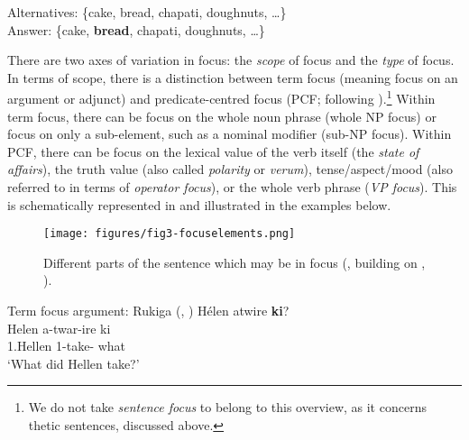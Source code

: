 \documentclass[output=paper]{langscibook}
\begin{document}
\gll
Alternatives:   {\{cake, bread, chapati, doughnuts, …\}}\\
Answer:     {\{cake, \textbf{bread}, chapati, doughnuts, …\}}\\

\z

There are two axes of variation in focus: the \textit{scope} of focus and the \textit{type} of focus. In terms of scope, there is a distinction between term focus (meaning focus on an argument or adjunct) and predicate-centred focus (PCF; following \citealt{Güldemann2003,Güldemann2009}).\footnote{We do not take  \textit{sentence focus} to belong to this overview, as it concerns thetic sentences, discussed above.} Within term focus, there can be focus on the whole noun phrase (whole NP focus) or focus on only a sub-element, such as a nominal modifier (sub-NP focus). Within PCF, there can be focus on the lexical value of the verb itself (the \textit{state of affairs}), the truth value (also called \textit{polarity} or \textit{verum}), tense/aspect/mood (also referred to in terms of \textit{operator focus}), or the whole verb phrase (\textit{VP focus}). This is schematically represented in  and illustrated in the examples below.

\begin{figure}
\texttt{[image: figures/fig3-focuselements.png]}

\caption{Different parts of the sentence which may be in focus (\citealt{vanderWal2021}, building on \citealt{Dik1997,Güldemann2009,Zimmermann2016}, \citealt[540]{GüldemannFiedler2022}).}
\label{fig:focuselements}
\end{figure}



\ea
Term focus argument: Rukiga (, \cite{chapters/rukiga})
\ea
Hélen atwire \textbf{ki}?\\
\gll
Helen  a-twar-ire  ki\\
1.Hellen  1\SM-{}take-\PFV{}  what\\
\glt
‘What did Hellen take?’\\
\end{document}
